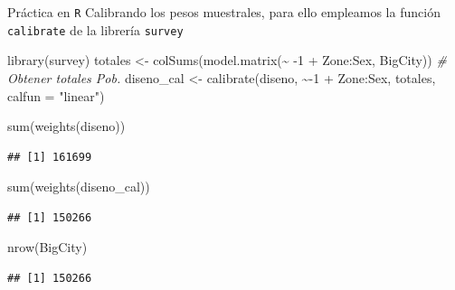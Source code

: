 \documentclass[
  english,
  ignorenonframetext,
]{beamer}
\newenvironment{Shaded}{\begin{snugshade}}{\end{snugshade}}
\newcommand{\AttributeTok}[1]{\textcolor[rgb]{0.77,0.63,0.00}{#1}}
\newcommand{\CommentTok}[1]{\textcolor[rgb]{0.56,0.35,0.01}{\textit{#1}}}
\newcommand{\DecValTok}[1]{\textcolor[rgb]{0.00,0.00,0.81}{#1}}
\newcommand{\FunctionTok}[1]{\textcolor[rgb]{0.00,0.00,0.00}{#1}}
\newcommand{\NormalTok}[1]{#1}
\newcommand{\OtherTok}[1]{\textcolor[rgb]{0.56,0.35,0.01}{#1}}
\newcommand{\SpecialCharTok}[1]{\textcolor[rgb]{0.00,0.00,0.00}{#1}}
\newcommand{\StringTok}[1]{\textcolor[rgb]{0.31,0.60,0.02}{#1}}
\begin{document}
\begin{frame}[fragile]{Práctica en \texttt{R}}
\protect\hypertarget{pruxe1ctica-en-r-12}{}
Calibrando los pesos muestrales, para ello empleamos la función
\texttt{calibrate} de la librería \texttt{survey}

\begin{Shaded}
\begin{Highlighting}[]
\FunctionTok{library}\NormalTok{(survey)}
\NormalTok{totales }\OtherTok{\textless{}{-}} \FunctionTok{colSums}\NormalTok{(}\FunctionTok{model.matrix}\NormalTok{(}\SpecialCharTok{\textasciitilde{}} \SpecialCharTok{{-}}\DecValTok{1} \SpecialCharTok{+}\NormalTok{ Zone}\SpecialCharTok{:}\NormalTok{Sex, BigCity)) }\CommentTok{\# Obtener totales Pob. }
\NormalTok{diseno\_cal }\OtherTok{\textless{}{-}} \FunctionTok{calibrate}\NormalTok{(diseno, }\SpecialCharTok{\textasciitilde{}{-}}\DecValTok{1} \SpecialCharTok{+}\NormalTok{ Zone}\SpecialCharTok{:}\NormalTok{Sex, totales, }\AttributeTok{calfun =} \StringTok{"linear"}\NormalTok{)  }

\FunctionTok{sum}\NormalTok{(}\FunctionTok{weights}\NormalTok{(diseno))}
\end{Highlighting}
\end{Shaded}

\begin{verbatim}
## [1] 161699
\end{verbatim}

\begin{Shaded}
\begin{Highlighting}[]
\FunctionTok{sum}\NormalTok{(}\FunctionTok{weights}\NormalTok{(diseno\_cal))}
\end{Highlighting}
\end{Shaded}

\begin{verbatim}
## [1] 150266
\end{verbatim}

\begin{Shaded}
\begin{Highlighting}[]
\FunctionTok{nrow}\NormalTok{(BigCity)}
\end{Highlighting}
\end{Shaded}

\begin{verbatim}
## [1] 150266
\end{verbatim}

\begin{Shaded}
\end{Shaded}
\end{frame}
\end{document}
